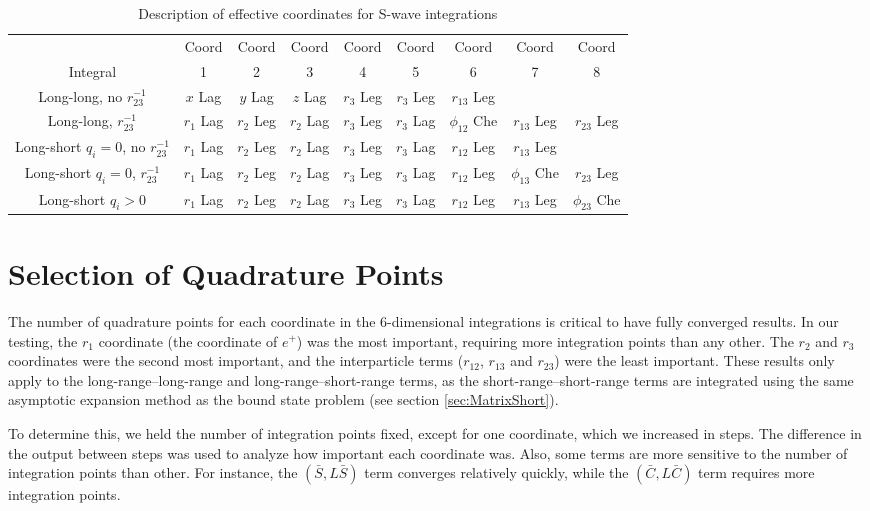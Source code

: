 \documentclass[Dissertation.tex]{subfiles}
\begin{document}
\begin{table}[H]
\begin{center}
\begin{tabular}{|c|c|c|c|c|c|c|c|c|}
\hline
 & Coord & Coord & Coord & Coord & Coord & Coord & Coord & Coord\\
Integral & 1 & 2 & 3 & 4 & 5 & 6 & 7 & 8 \\
\hline
 Long-long, no $r_{23}^{-1}$ & $x$ Lag & $y$ Lag & $z$ Lag & $r_3$ Leg & $r_3$ Leg & $r_{13}$ Leg & & \\
 Long-long, $r_{23}^{-1}$ & $r_1$ Lag & $r_2$ Leg & $r_2$ Lag & $r_3$ Leg & $r_3$ Lag & $\phi_{12}$ Che & $r_{13}$ Leg & $r_{23}$ Leg \\
\hline
 Long-short $q_i = 0$, no $r_{23}^{-1}$ & $r_1$ Lag & $r_2$ Leg & $r_2$ Lag & $r_3$ Leg & $r_3$ Lag & $r_{12}$ Leg & $r_{13}$ Leg & \\
 Long-short $q_i = 0$, $r_{23}^{-1}$ & $r_1$ Lag & $r_2$ Leg & $r_2$ Lag & $r_3$ Leg & $r_3$ Lag & $r_{12}$ Leg & $\phi_{13}$ Che & $r_{23}$ Leg \\
 Long-short $q_i > 0$ & $r_1$ Lag & $r_2$ Leg & $r_2$ Lag & $r_3$ Leg & $r_3$ Lag & $r_{12}$ Leg & $r_{13}$ Leg & $\phi_{23}$ Che \\
\hline
\end{tabular}
\caption{Description of effective coordinates for S-wave integrations}
\label{tab:EffectiveCoords}
\end{center}
\end{table}


\section{Selection of Quadrature Points}
\label{sec:SelQuadPoints1}
The number of quadrature points for each coordinate in the 6-dimensional integrations is critical to have fully converged results. In our testing, the $r_1$ coordinate (the coordinate of $e^+$) was the most important, requiring more integration points than any other. The $r_2$ and $r_3$ coordinates were the second most important, and the interparticle terms ($r_{12}$, $r_{13}$ and $r_{23}$) were the least important. These results only apply to the long-range--long-range and long-range--short-range terms, as the short-range--short-range terms are integrated using the same asymptotic expansion method as the bound state problem (see section \ref{sec:MatrixShort}).

To determine this, we held the number of integration points fixed, except for one coordinate, which we increased in steps. The difference in the output between steps was used to analyze how important each coordinate was. Also, some terms are more sensitive to the number of integration points than other. For instance, the $(\bar{S},L\bar{S})$ term converges relatively quickly, while the $(\bar{C},L\bar{C})$ term requires more integration points.
\end{document}
